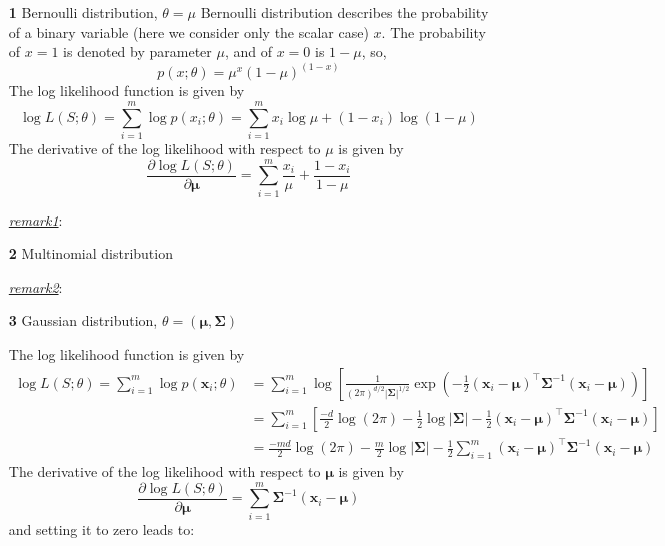 \documentclass{article}
\begin{document}
	\begin{itemize}
	\item [\textbf{1}] Bernoulli distribution, $\theta={\mu}$
	Bernoulli distribution describes the probability of a binary variable (here we consider only the scalar case) $x$. The probability of $x=1$ is denoted by parameter $\mu$, and of $x=0$ is $1-\mu$, so,
	\begin{equation*}
	p(x;\theta)=\mu^x(1-\mu)^{(1-x)}
	\end{equation*}
	The log likelihood function is given by
	\begin{equation*}
	\log L(S;\theta) = \sum_{i=1}^m \log p(x_i;\theta) = \sum_{i=1}^m x_i\log \mu + (1-x_i)\log(1-\mu)
	\end{equation*}
The derivative of the log likelihood with respect to $\mu$ is given by
	\begin{equation*}
	\frac{\partial \log L(S;\theta)}{\partial \bm{\mu}} = \sum_{i=1}^m \frac{x_i}{\mu} + \frac{1-x_i}{1-\mu}
	\end{equation*}
	\begin{footnotesize}
	\textit{\underline{remark1}}: 
	\end{footnotesize}
	
	\item [\textbf{2}] Multinomial distribution
	
	\begin{footnotesize}
	\textit{\underline{remark2}}:
	\end{footnotesize}
	
	\item [\textbf{3}] Gaussian distribution, $\theta=(\bm{\mu},\bm{\Sigma})$
	
	The log likelihood function is given by
	\begin{equation*}
	\begin{split}
	\log L(S;\theta) = \sum_{i=1}^m \log p(\bm{x}_i;\theta) &= \sum_{i=1}^m \log \left[ \frac{1}{(2\pi)^{d/2} |\bm{\Sigma}|^{1/2}} \exp \left( -\frac{1}{2}(\bm{x}_i - \bm{\mu})^\top \bm{\Sigma}^{-1} (\bm{x}_i - \bm{\mu}) \right) \right]  \\
	&= \sum_{i=1}^m \left[\frac{-d}{2} \log (2\pi) - \frac{1}{2}\log |\bm{\Sigma}| -\frac{1}{2}(\bm{x}_i - \bm{\mu})^\top \bm{\Sigma}^{-1} (\bm{x}_i - \bm{\mu}) \right]  \\
	&= \frac{-md}{2} \log (2\pi) - \frac{m}{2}\log |\bm{\Sigma}| - \frac{1}{2} \sum_{i=1}^m (\bm{x}_i - \bm{\mu})^\top \bm{\Sigma}^{-1} (\bm{x}_i - \bm{\mu})
	\end{split}
	\end{equation*}
	The derivative of the log likelihood with respect to $\bm{\mu}$ is given by
	\begin{equation*}
	\frac{\partial \log L(S;\theta)}{\partial \bm{\mu}} = \sum_{i=1}^m \bm{\Sigma}^{-1} (\bm{x}_i - \bm{\mu})
	\end{equation*}
and setting it to zero leads to:
	

\end{itemize}
\end{document}
